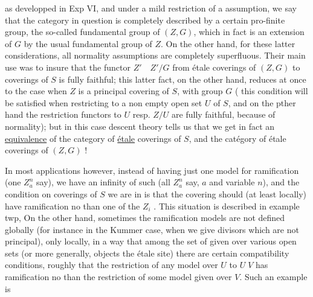 as developped in Exp VI, and under a mild restriction  of a  assumption, we  say that the category in question is  completely described by a certain pro-finite group, the so-called fundamental group of $(Z,G)$, which in fact is an extension of $G$ by the usual fundamental group of $Z$. On the other hand, for these latter considerations, all normality assumptions are completely superfluous. Their main use was to insure that the functor $Z'\quad Z'/G$ from étale coverings of $(Z,G)$ to coverings of $S$ is fully faithful; this latter fact, on the other hand, reduces at once to the case when $Z$ is a principal covering of $S$, with group $G$ ( this condition will be satisfied when restricting to a non empty open set $U$ of $S$, and on the pther hand the restriction functors  to $U$ resp. $Z/U$ are fully faithful, because of normality); but in this case descent theory tells us that we get in fact an \uline{equivalence} of the category of \uline{étale} coverings of $S$, and the catégory of étale coverings of $(Z,G)$ !

In most applications however, instead of having just one model for ramification (one $Z_a^n$ say), we have an infinity of such (all $Z_a^n$ say,  $a$ and variable $n$), and the condition on coverings  of $S$ we are  in is that the covering should (at least locally) have ramification no  than one of the $Z_i$ . This situation is described in example twp, On the other hand, sometimes the ramification models are not defined globally (for instance in the Kummer case, when we give  divisors which are not principal), only locally, in a way that among the set of  given over various open sets (or more generally, objects  the étale site) there are certain compatibility conditions, roughly that the restriction of any model over $U$ to $U\;V$ has ramification no  than the restriction of some model given over $V$. Such an example is

